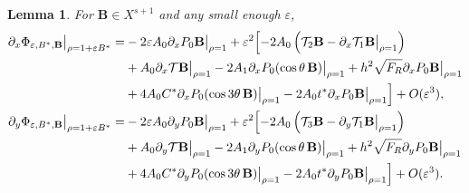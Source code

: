 \documentclass[12pt,reqno]{amsart}
\numberwithin{equation}{section}
\newtheorem{lemma}[theorem]{Lemma}
\theoremstyle{definition}
\theoremstyle{remark}
\begin{document}
\begin{lemma}\label{lemma: expan of px-Phi}
		For $ \textbf{B} \in X^{s+1} $ and any small enough $\varepsilon$,	
\begin{align*}
\partial_x\Phi_{\varepsilon,B^*, \textbf{B}}\big|_{\rho=1+\varepsilon B^*}
=&-2\varepsilon A_0  \partial_xP_0  \textbf{B}\big|_{\rho=1}+\varepsilon^2\Bigl[-2A_0 \left(\mathcal{T}_2  \textbf{B}-\partial_x  \mathcal{T}_1  \textbf{B}\big|_{\rho=1}\right)
   \\
& +A_0\partial_x\mathcal{T} \textbf{B}\big|_{\rho=1}-2A_1\partial_xP_0(  \cos\theta\, \textbf{B})\big|_{\rho=1}+h^2\sqrt{F_R}\partial_xP_0  \textbf{B}\big|_{\rho=1}
 \\
&  +4A_0C^*\partial_xP_0(\cos3\theta\,  \textbf{B} )\big|_{\rho=1}-2A_0t^*\partial_xP_0  \textbf{B}\big|_{\rho=1}\Bigr]+O(\varepsilon^3), \\
\partial_y\Phi_{\varepsilon,B^*,  \textbf{B}}\big|_{\rho=1+\varepsilon B^*}
=&-2\varepsilon A_0   \partial_y P_0  \textbf{B}\big|_{\rho=1}+\varepsilon^2\Bigl[-2  A_0 \left(\mathcal{T}_3  \textbf{B}-\partial_y  \mathcal{T}_1  \textbf{B}\big|_{\rho=1}\right)
  \\
&  +A_0\partial_y\mathcal{T}  \textbf{B}\big|_{\rho=1}-2A_1\partial_yP_0(  \cos\theta\, \textbf{B})\big|_{\rho=1}+h^2\sqrt{F_R}\partial_yP_0  \textbf{B}\big|_{\rho=1}
 \\
&  +4A_0C^*\partial_yP_0(  \cos3\theta\, \textbf{B}  )\big|_{\rho=1}-2A_0t^*\partial_yP_0  \textbf{B}\big|_{\rho=1}\Bigr]+O(\varepsilon^3).
\end{align*}
\end{lemma}
\end{document}
